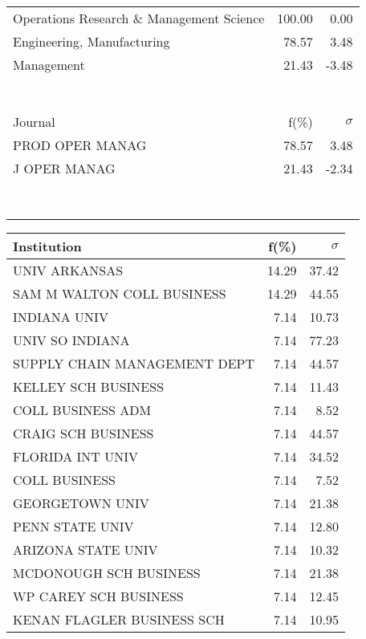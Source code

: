 \documentclass[a4paper,11pt]{report}
\begin{document}
\begin{landscape}
\begin{table}[!ht]
{\begin{tabular}{|l r  r|}
\hline
Operations Research \& Management Science & 100.00 & 0.00\\
Engineering, Manufacturing & 78.57 & 3.48\\
Management & 21.43 & -3.48\\
 &  & \\
 &  & \\
 &  & \\
 &  & \\
 &  & \\
 &  & \\
 &  & \\
\hline
\hline
Journal & f(\%) & $\sigma$\\
\hline
PROD OPER MANAG & 78.57 & 3.48\\
J OPER MANAG & 21.43 & -2.34\\
 &  & \\
 &  & \\
 &  & \\
 &  & \\
 &  & \\
 &  & \\
 &  & \\
 &  & \\
\hline
\end{tabular}
}
{\scriptsize\begin{tabular}{|l r r|}
\hline
Institution & f(\%) & $\sigma$\\
\hline
UNIV ARKANSAS & 14.29 & 37.42\\
SAM M WALTON COLL BUSINESS & 14.29 & 44.55\\
INDIANA UNIV & 7.14 & 10.73\\
UNIV SO INDIANA & 7.14 & 77.23\\
SUPPLY CHAIN MANAGEMENT DEPT & 7.14 & 44.57\\
KELLEY SCH BUSINESS & 7.14 & 11.43\\
COLL BUSINESS ADM & 7.14 & 8.52\\
CRAIG SCH BUSINESS & 7.14 & 44.57\\
FLORIDA INT UNIV & 7.14 & 34.52\\
COLL BUSINESS & 7.14 & 7.52\\
GEORGETOWN UNIV & 7.14 & 21.38\\
PENN STATE UNIV & 7.14 & 12.80\\
ARIZONA STATE UNIV & 7.14 & 10.32\\
MCDONOUGH SCH BUSINESS & 7.14 & 21.38\\
WP CAREY SCH BUSINESS & 7.14 & 12.45\\
KENAN FLAGLER BUSINESS SCH & 7.14 & 10.95\\

\end{tabular}}
\end{table}
\end{landscape}
\end{document}
